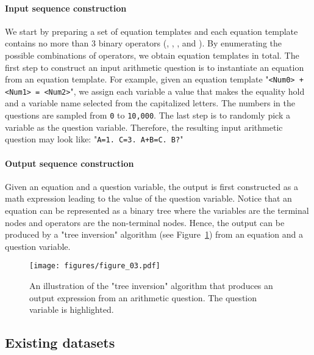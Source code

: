 \documentclass[11pt]{article}
\begin{document}
    \paragraph{Input sequence construction}
We start by preparing a set of equation templates and each equation template contains no more than 3 binary operators (, , , and ).
By enumerating the possible combinations of operators, we obtain  equation templates in total.
The first step to construct an input arithmetic question is to instantiate an equation from an equation template.
For example, given an equation template "{\small \texttt{<Num0> + <Num1> = <Num2>}}",
        we assign each variable a value that makes the equality hold and a variable name selected from the capitalized letters.
The numbers in the questions are sampled from {\small \texttt{0}} to {\small \texttt{10,000}}.
The last step is to randomly pick a variable as the question variable.
Therefore, the resulting input arithmetic question may look like: "{\small \texttt{A=1. C=3. A+B=C. B?}}"


    \paragraph{Output sequence construction}
Given an equation and a question variable, the output is first constructed as a math expression leading to the value of the question variable.
Notice that an equation can be represented as a binary tree where the variables are the terminal nodes and operators are the non-terminal nodes.
Hence, the output can be produced by a "tree inversion" algorithm (see Figure~\ref{fig:tree_inv}) from an equation and a question variable.



\begin{figure}[h]
    \vspace{+5pt}
    \captionsetup{type=figure}
    \centering
    \texttt{[image: figures/figure\_03.pdf]}
    \vspace{-5pt}
    \caption{
        \label{fig:tree_inv}
An illustration of the "tree inversion" algorithm that produces an output expression from an arithmetic question.
The question variable is highlighted.
    }
\end{figure}


\subsection{Existing datasets}\label{app:exist}
\end{document}
